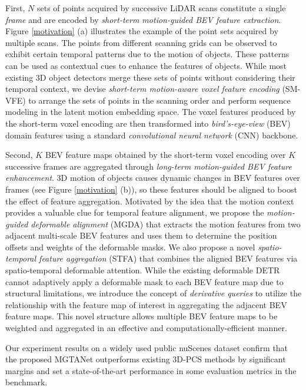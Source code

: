\documentclass[letterpaper]{article} \usepackage{aaai23}  \usepackage{times}  \usepackage{helvet}  \usepackage{courier}  \usepackage[hyphens]{url}  \usepackage{graphicx} \urlstyle{rm} \def\UrlFont{\rm}  \usepackage{natbib}  \usepackage{caption} \frenchspacing  \setlength{\pdfpagewidth}{8.5in} \usepackage{algorithm}
\begin{document}
First, $N$ sets of points acquired by successive LiDAR scans constitute a single {\it frame} and are encoded by {\it short-term motion-guided BEV feature extraction}. Figure \ref{motivation} (a) illustrates the example of the point sets acquired by multiple scans. The points from different scanning grids can be observed to exhibit certain temporal patterns due to the motion of objects. These patterns can be used as contextual cues to enhance the features of objects. While most existing 3D object detectors merge these sets of points without considering their temporal context, we devise {\it short-term motion-aware voxel feature encoding} (SM-VFE) to arrange the sets of points in the scanning order and perform sequence modeling in the latent motion embedding space. The voxel features produced by the short-term voxel encoding are then transformed into {\it bird's-eye-view} (BEV) domain features using a standard {\it convolutional neural network} (CNN) backbone.


Second, $K$ BEV feature maps obtained by the short-term voxel encoding over $K$ successive frames are aggregated through {\it long-term motion-guided BEV feature enhancement}.  3D motion of objects causes dynamic changes in BEV features over frames (see Figure \ref{motivation} (b)), so these features should be aligned to boost the effect of feature aggregation. Motivated by the idea that the motion context provides a valuable clue for temporal feature alignment, we propose the {\it motion-guided deformable alignment} (MGDA) that extracts the motion features from two adjacent multi-scale BEV features and uses them to determine the position offsets and weights of the deformable masks. We also propose a novel {\it spatio-temporal feature aggregation} (STFA) that combines the aligned BEV features via spatio-temporal deformable attention. While the existing deformable DETR \cite{def-detr} cannot adaptively apply a deformable mask to each BEV feature map due to structural limitations, we introduce the concept of {\it derivative queries} to utilize the relationship with the feature map of interest in aggregating the adjacent BEV feature maps. This novel structure allows multiple BEV feature maps to be weighted and aggregated in an effective and computationally-efficient manner.

Our experiment results on a widely used public nuScenes dataset \cite{nuscenes} confirm that the proposed MGTANet outperforms existing 3D-PCS methods by significant margins and set a  state-of-the-art performance in some evaluation metrics in the benchmark.
\end{document}
